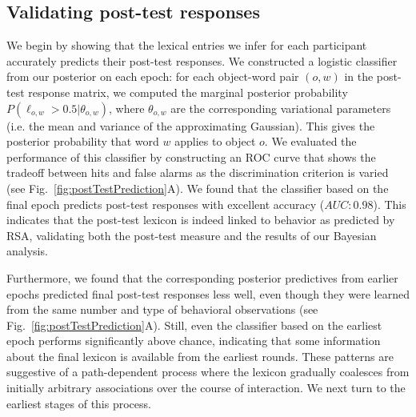 \documentclass[10pt,letterpaper]{article}
\newcommand{\ndg}[1]{\textcolor{Green}{[ndg: #1]}}
\begin{document}

\subsection{Validating post-test responses}

We begin by showing that the lexical entries we infer for each participant accurately predicts their post-test responses. 
We constructed a logistic classifier from our posterior on each epoch: for each object-word pair $(o,w)$ in the post-test response matrix, we computed the marginal posterior probability $P(\ell_{o,w} > 0.5| \theta_{o,w})$, where $\theta_{o,w}$ are the corresponding variational parameters (i.e. the mean and variance of the approximating Gaussian). This gives the posterior probability that word $w$ applies to object $o$. We evaluated the performance of this classifier by constructing an ROC curve that shows the tradeoff between hits and false alarms as the discrimination criterion is varied (see Fig.\ \ref{fig:postTestPrediction}A). We found that the classifier based on the final epoch predicts post-test responses with excellent accuracy ($AUC: 0.98$). This indicates that the post-test lexicon is indeed linked to behavior as predicted by RSA, validating both the post-test measure and the results of our Bayesian analysis.

Furthermore, we found that the corresponding posterior predictives from earlier epochs predicted final post-test responses less well, even though they were learned from the same number and type of behavioral observations (see Fig.\ \ref{fig:postTestPrediction}A). Still, even the classifier based on the earliest epoch performs significantly above chance, indicating that some information about the final lexicon is available from the earliest rounds. These patterns are suggestive of a path-dependent process where the lexicon gradually coalesces from initially arbitrary associations over the course of interaction. We next turn to the earliest stages of this process.%
\end{document}
